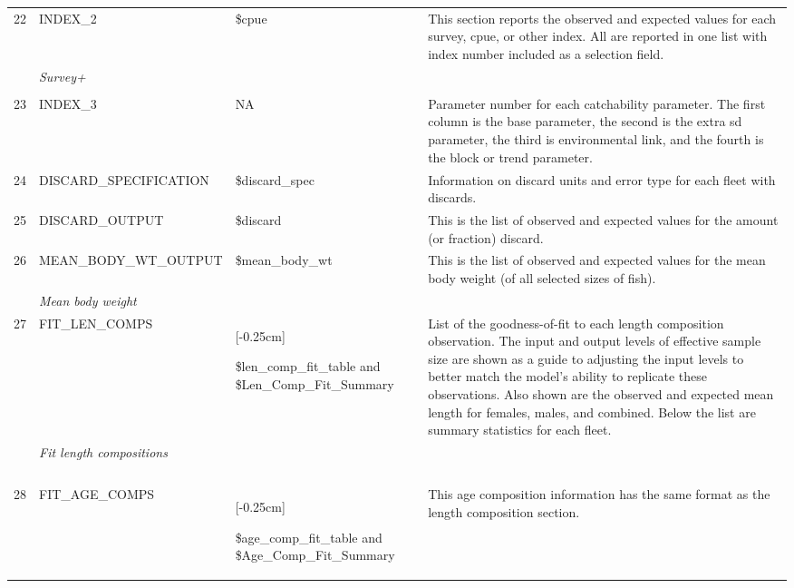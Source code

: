 \begin{landscape}
\begin{longtable}{p{1.5cm} p{5.5cm} >{\RaggedRight\arraybackslash}p{4.25cm} p{9.75cm}}
    22 & INDEX\_2 & \$cpue & \multirow{1}{1cm}[-0.25cm]{\parbox{9.5cm}{This section reports the observed and expected values for each survey, \gls{cpue}, or other index. All are reported in one list with index number included as a selection field. }} \\
       & \textit{Survey+} & & \\
       & & & \Bstrut\\
    23 & INDEX\_3 & NA & Parameter number for each catchability parameter. The first column is the base parameter, the second is the extra \gls{sd} parameter, the third is environmental link, and the fourth is the block or trend parameter. \Bstrut\\
    24 & DISCARD\_SPECIFICATION & \$discard\_spec & Information on discard units and error type for each fleet with discards. \Bstrut\\
    25 & DISCARD\_OUTPUT & \$discard & This is the list of observed and expected values for the amount (or fraction) discard. \Bstrut\\
    26 & MEAN\_BODY\_WT\_OUTPUT & \$mean\_body\_wt & \multirow{1}{1cm}[-0.25cm]{\parbox{9.5cm}{This is the list of observed and expected values for the mean body weight (of all selected sizes of fish).}} \\
       & \textit{Mean body weight} & & \Bstrut\\
    27 & FIT\_LEN\_COMPS & \multirow{1}{1cm}[-0.25cm]{\parbox{4cm}{\$len\_comp\_fit\_table and \$Len\_Comp\_Fit\_Summary}} & \multirow{1}{1cm}[-0.25cm]{\parbox{9.5cm}{List of the goodness-of-fit to each length composition observation. The input and output levels of effective sample size are shown as a guide to adjusting the input levels to better match the model's ability to replicate these observations. Also shown are the observed and expected mean length for females, males, and combined. Below the list are summary statistics for each fleet.}} \\
       & \textit{Fit length compositions} & & \\
       & & & \\
       & & & \\
       & & & \Bstrut\\
       & & & \Bstrut\\
    28 & FIT\_AGE\_COMPS & \multirow{1}{1cm}[-0.25cm]{\parbox{4cm}{\$age\_comp\_fit\_table and \$Age\_Comp\_Fit\_Summary}} & \multirow{1}{1cm}[-0.25cm]{\parbox{9.5cm}{This age composition information has the same format as the length composition section.}} \\

\end{longtable}
\end{landscape}
